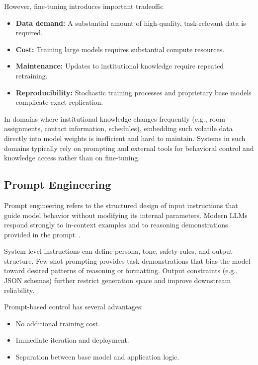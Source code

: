 However, fine-tuning introduces important tradeoffs:

\begin{itemize}
    \item \textbf{Data demand:} A substantial amount of high-quality, task-relevant data is required.
    \item \textbf{Cost:} Training large models requires substantial compute resources.
    \item \textbf{Maintenance:} Updates to institutional knowledge require repeated retraining.
    \item \textbf{Reproducibility:} Stochastic training processes and proprietary base models complicate exact replication.
\end{itemize}

In domains where institutional knowledge changes frequently (e.g., room assignments, contact information, schedules), embedding such volatile data directly into model weights is inefficient and hard to maintain.
Systems in such domains typically rely on prompting and external tools for behavioral control and knowledge access rather than on fine-tuning.

\subsection{Prompt Engineering}

Prompt engineering refers to the structured design of input instructions that guide model behavior without modifying its internal parameters.
Modern LLMs respond strongly to in-context examples and to reasoning demonstrations provided in the prompt~\cite{brown2020language, wei2022chain}.

System-level instructions can define persona, tone, safety rules, and output structure.
Few-shot prompting provides task demonstrations that bias the model toward desired patterns of reasoning or formatting.
Output constraints (e.g., JSON schemas) further restrict generation space and improve downstream reliability.

Prompt-based control has several advantages:

\begin{itemize}
    \item No additional training cost.
    \item Immediate iteration and deployment.
    \item Separation between base model and application logic.
\end{itemize}

